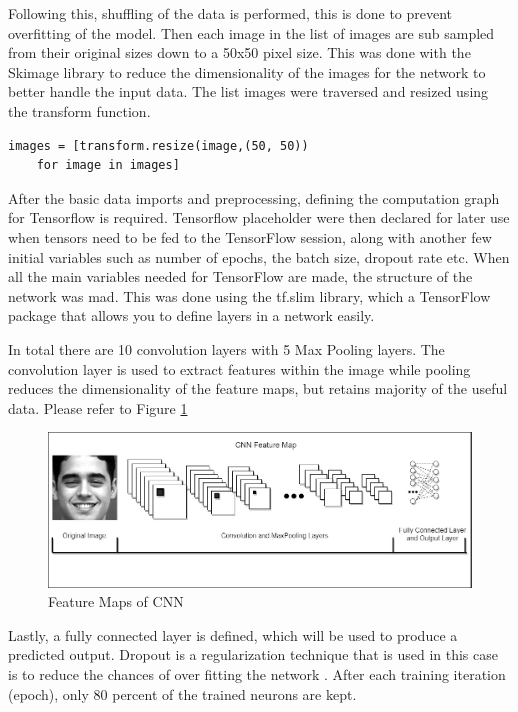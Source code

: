 Following this, shuffling of the data is performed, this is done to prevent overfitting of the model. Then each image in the list of images are sub sampled from their original sizes down to a 50x50 pixel size. This was done with the Skimage library to reduce the dimensionality of the images for the network to better handle the input data. The list images were traversed and resized using the transform function. 
\begin{lstlisting}[frame=single]
images = [transform.resize(image,(50, 50))
	for image in images]
\end{lstlisting}

After the basic data imports and preprocessing, defining the computation graph for Tensorflow is required. Tensorflow placeholder were then declared for later use when tensors need to be fed to the TensorFlow session, along with another few initial variables such as number of epochs, the batch size, dropout rate etc. When all the main variables needed for TensorFlow are made, the structure of the network was mad. This was done using the tf.slim library, which a TensorFlow package that allows you to define layers in a network easily. 

In total there are 10 convolution layers with 5 Max Pooling layers. The convolution layer is used to extract features within the image while pooling reduces the dimensionality of the feature maps, but retains majority of the useful data. Please refer to Figure \ref{map}

\begin{figure}[ht]
	\begin{center}
		\advance\leftskip-3cm
		\advance\rightskip-3cm
		\includegraphics[keepaspectratio=true,scale=0.5]{__resources/implementation/map.jpg}
		\caption{Feature Maps of CNN}
		\label{map}
	\end{center}
\end{figure}

Lastly, a fully connected layer is defined, which will be used to produce a predicted output. Dropout is a regularization technique that is used in this case is to reduce the chances of over fitting the network \citep{JMLR}. After each training iteration (epoch), only 80 percent of the trained neurons are kept.\\ \\

